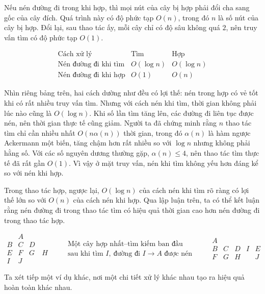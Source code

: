 \documentclass[11pt]{article}
\begin{document}
Nếu nén đường đi trong khi hợp, thì mọi nút của cây bị hợp phải đổi cha sang
gốc của cây đích. Quá trình này có độ phức tạp $O(n)$, trong đó $n$ là số nút
của cây bị hợp. Đổi lại, sau thao tác ấy, mỗi cây chỉ có độ sâu không quá
$2$, nên truy vấn tìm có độ phức tạp $O(1)$.

\[
\begin{array}{c|c|c}
\text{Cách xử lý} & \text{Tìm} & \text{Hợp}\\ \hline
\text{Nén đường đi khi tìm} & O(\log n) & O(\log n)\\
\text{Nén đường đi khi hợp} & O(1) & O(n)
\end{array}
\]

Nhìn riêng bảng trên, hai cách dường như đều có lợi thế: nén trong hợp có vẻ
tốt khi có rất nhiều truy vấn tìm. Nhưng với cách nén khi tìm, thời gian
không phải lúc nào cũng là $O(\log n)$. Khi số lần tìm tăng lên, các đường đi
liên tục được nén, nên thời gian thực tế cũng giảm. Người ta đã chứng minh
rằng $n$ thao tác tìm chỉ cần nhiều nhất $O(n\alpha(n))$ thời gian, trong đó
$\alpha(n)$ là hàm ngược Ackermann một biến, tăng chậm hơn rất nhiều so với
$\log n$ nhưng không phải hằng số. Với các số nguyên dương thường gặp,
$\alpha(n)\le 4$, nên thao tác tìm thực tế đã rất gần $O(1)$. Vì vậy ở mặt
truy vấn, nén khi tìm không yếu hơn đáng kể so với nén khi hợp.

Trong thao tác hợp, ngược lại, $O(\log n)$ của cách nén khi tìm rõ ràng có
lợi thế lớn so với $O(n)$ của cách nén khi hợp. Qua lập luận trên, ta có thể
kết luận rằng nén đường đi trong thao tác tìm có hiệu quả thời gian cao hơn
nén đường đi trong thao tác hợp.

\[
\begin{array}{ccc}
& A &\\
B & C & D\\
E & F & G\quad H\\
I & J &
\end{array}
\qquad
\begin{array}{c}
\text{Một cây hợp nhất--tìm kiếm ban đầu}\\[0.5em]
\text{sau khi tìm } I,\ \text{đường đi } I\to A \text{ được nén}
\end{array}
\qquad
\begin{array}{cccccc}
A\\
B & C & D & I & E\\
F & G & H & & J
\end{array}
\]

Ta xét tiếp một ví dụ khác, nơi một chi tiết xử lý khác nhau tạo ra hiệu quả
hoàn toàn khác nhau.
\end{document}
